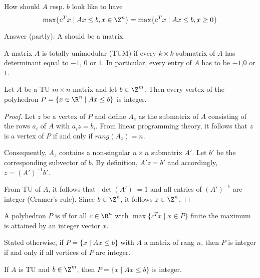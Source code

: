 \begin{lec}[2012-01-12]\end{lec}

\begin{qstn}
How should $A$ resp. $b$ look like to have
\[
	\max \{ c^T x \mid A x \leq b, x \in \Z^n \} = \max \{ c^T x \mid Ax \leq b, x \geq 0 \}
\]
\end{qstn}
Answer (partly):
A should be a  matrix.

\begin{defn}
A matrix $A$ is totally unimodular (TUM) if every $k \times k$ submatrix of
$A$ has determinant equal to $-1$, $0$ or $1$.
In particular, every entry of $A$ has to be $-1$,$0$ or $1$.
\end{defn}


\begin{thm}
Let $A$ be a TU $m \times n$ matrix and let $b \in \Z^m$.
Then every vertex of the polyhedron $P = \{ x \in \R^n \mid A x \leq b \}$
is integer.
\end{thm}
\begin{proof}
Let $z$ be a vertex of $P$ and define $A_z$ as the submatrix of $A$
consisting of the rows $a_i$ of $A$ with $a_i z = b_i$. From linear
programming theory, it follows that $z$ is a vertex of $P$ if and only if
$rang(A_z) = n$.

Consequently, $A_z$ contains a non-singular $n \times n$ submatrix $A'$.
Let $b'$ be the corresponding subvector of $b$.
By definition, $A'z=b'$ and accordingly, $z = (A')^{-1} b'$.

From TU of $A$, it follows that $|\det(A')| = 1$ and all entries of
$(A')^{-1}$ are integer (Cramer's rule). Since $b \in \Z^n$, it follows $z
\in \Z^n$.
\end{proof}

\begin{defn}
A polyhedron $P$ is  if for all $c \in \R^n$ with
$\max\{ c^T x \mid x \in P \}$ finite the maximum is attained by an integer
vector $x$.

Stated otherwise, if $P = \{ x \mid Ax \leq b \}$ with $A$ a matrix of rang
$n$, then $P$ is integer if and only if all vertices of $P$ are integer.
\end{defn}

\begin{cor}
If $A$ is TU and $b \in \Z^m$, then $P = \{ x \mid Ax\leq b \}$ is integer.
\end{cor}

